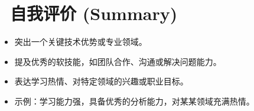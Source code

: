 \documentclass{resume}
\begin{document}
\section{\faThumbsOUp\ 自我评价 (Summary)}
\begin{itemize}[parsep=0.2ex] 
  \item 突出一个关键技术优势或专业领域。
  \item 提及优秀的软技能，如团队合作、沟通或解决问题能力。 
  \item 表达学习热情、对特定领域的兴趣或职业目标。 
  \item 示例：学习能力强，具备优秀的分析能力，对某某领域充满热情。 
\end{itemize}

\end{document}
